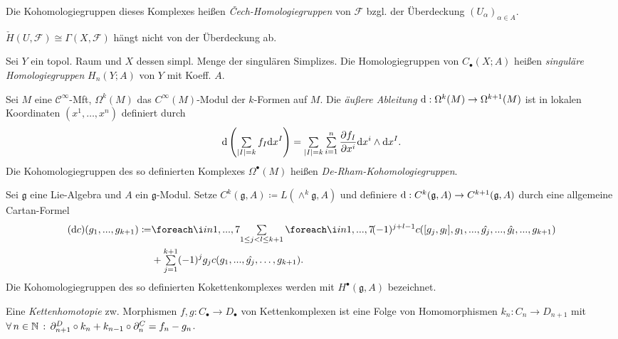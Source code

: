\documentclass{cheat-sheet}
\newcommand{\nspace}[1]{\foreach \i in {1,...,#1}{ \! }} %
\newcommand{\CC}[1]{{#1}_{\bullet}} %
\newcommand{\Fais}{\mathcal{F}} %
\newcommand{\Lg}{\mathfrak{g}} %
\newcommand{\Cont}{\mathcal{C}} %
\begin{document}
\begin{defn}
  Die Kohomologiegruppen dieses Komplexes heißen \emph{Čech-Homologiegruppen} von $\Fais$ bzgl. der Überdeckung $(U_\alpha)_{\alpha \in A}$.
\end{defn}

\begin{bem}
  $\check{H}(U, \Fais) \cong \Gamma(X, \Fais)$ hängt nicht von der Überdeckung ab.
\end{bem}

\begin{defn}
  Sei $Y$ ein topol. Raum und $X$ dessen simpl. Menge der singulären Simplizes.
  Die Homologiegruppen von $\CC{C}(X; A)$ heißen \emph{singuläre Homologiegruppen} $H_n(Y; A)$ von $Y$ mit Koeff. $A$.
\end{defn}


\begin{defn}
  Sei $M$ eine $\Cont^\infty$-Mft, $\Omega^k(M)$ das $C^\infty(M)$-Modul der $k$-Formen auf $M$. Die \emph{äußere Ableitung} $\mathrm{d} : \Omega^k(M) \to \Omega^{k+1}(M)$ ist in lokalen Koordinaten $(x^1, \ldots, x^n)$ definiert durch
  \[ \d \left( \sum_{\abs{I} = k} f_I \d x^I \right) = \sum_{\abs{I} = k} \sum_{i=1}^n \frac{\partial f_I}{\partial x^i} \d x^i \wedge \d x^I. \]
  Die Kohomologiegruppen des so definierten Komplexes $\Omega^\bullet(M)$ heißen \emph{De-Rham-Kohomologiegruppen}.
\end{defn}


\begin{defn}
  Sei $\Lg$ eine Lie-Algebra und $A$ ein $\Lg$-Modul. Setze $C^k(\Lg, A) \coloneqq L(\wedge^k \Lg, A)$ und definiere $\d : C^k(\Lg, A) \to C^{k+1}(\Lg, A)$ durch eine allgemeine Cartan-Formel
  \begin{align*}
    (\d c)(g_1, \nldots, g_{k+1}) \coloneqq & \nspace{7} \sum_{1 \leq j < l \leq k+1} \nspace{7} (-1)^{j+l-1} c([g_j, g_l], g_1, \nldots, \hat{g_j}, \nldots, \hat{g_l}, \nldots, g_{k+1}) \\
    & + \sum_{j=1}^{k+1} (-1)^j g_j c(g_1, \nldots, \hat{g_j}, \ldots, g_{k+1}).
  \end{align*}
  Die Kohomologiegruppen des so definierten Kokettenkomplexes werden mit $H^\bullet(\Lg, A)$ bezeichnet.
\end{defn}

\begin{defn}
  Eine \emph{Kettenhomotopie} zw. Morphismen $f, g : \CC{C} \to \CC{D}$ von Kettenkomplexen ist eine Folge von Homomorphismen $k_n : C_n \to D_{n+1}$ mit
  $\forall \, {n \in \mathbb{N}} \,:\, \partial^D_{n+1} \circ k_n + k_{n-1} \circ \partial^C_n = f_n - g_n$.
\end{defn}
\end{document}
